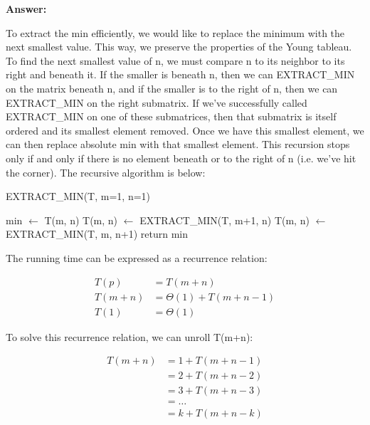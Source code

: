 \documentclass[]{book}
\theoremstyle{definition}
\begin{document}
\begin{enumerate}
    \textbf{Answer:}

    To extract the min efficiently, we would like to replace the minimum with the next smallest
    value. This way, we preserve the properties of the Young tableau. To find the next smallest
    value of n, we must compare n to its neighbor to its right and beneath it. If the smaller
    is beneath n, then we can EXTRACT\_MIN on the matrix beneath n, and if the smaller is to 
    the right of n, then we can EXTRACT\_MIN on the right submatrix. If we've successfully
    called EXTRACT\_MIN on one of these submatrices, then that submatrix is itself ordered
    and its smallest element removed. Once we have this smallest element, we can then replace
    absolute min with that smallest element. This recursion stops only if and only if
    there is no element beneath or to the right of n (i.e. we've hit the corner).
    The recursive algorithm is below:

    \begin{algorithm}[h]
    \caption{EXTRACT\_MIN(T, m=1, n=1)}
    \begin{algorithmic}[1]
        \STATE min $\leftarrow$ T(m, n)
            \STATE T(m, n) $\leftarrow$ EXTRACT\_MIN(T, m+1, n)
            \STATE T(m, n) $\leftarrow$ EXTRACT\_MIN(T, m, n+1)
        \ENDIF
        \STATE return min
    \end{algorithmic}
    \end{algorithm}

    The running time can be expressed as a recurrence relation:

    \begin{align*}
        T(p) &= T(m+n)\\
        T(m+n) &= \Theta(1) + T(m+n-1) \\
        T(1) &= \Theta(1)
    \end{align*}

    To solve this recurrence relation, we can unroll T(m+n):

    \begin{align*}
        T(m+n) &= 1 + T(m+n-1) \\
               &= 2 + T(m+n-2) \\
               &= 3 + T(m+n-3) \\
               &= \dots \\
               &= k + T(m+n-k)
    \end{align*}


\end{enumerate}
\end{document}
